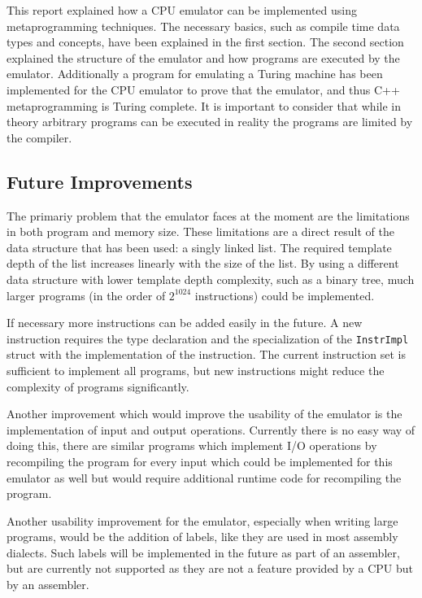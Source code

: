 
This report explained how a CPU emulator can be implemented using metaprogramming techniques.
The necessary basics, such as compile time data types and concepts, have been explained 
in the first section. The second section explained the structure of the emulator and how
programs are executed by the emulator. Additionally a program for emulating a Turing
machine has been implemented for the CPU emulator to prove that the emulator, and thus
C++ metaprogramming is Turing complete. It is important to consider that while in theory
arbitrary programs can be executed in reality the programs are limited by the compiler.

\subsection{Future Improvements}
The primariy problem that the emulator faces at the moment are the limitations in both program and memory size.
These limitations are a direct result of the data structure that has been used: a singly linked list. The required 
template depth of the list increases linearly with the size of the list. By using a different data structure with
lower template depth complexity, such as a binary tree, much larger programs (in the order of $2^{1024}$ instructions)
could be implemented.

If necessary more instructions can be added easily in the future. A new instruction
requires the type declaration and the specialization of the \lstinline{InstrImpl}
struct with the implementation of the instruction. The current instruction set
is sufficient to implement all programs, but new instructions might reduce the
complexity of programs significantly.

Another improvement which would improve the usability of the emulator is the implementation
of input and output operations. Currently there is no easy way of doing this, there are
similar programs which implement I/O operations by recompiling the program for
every input \cite{iohack1} \cite{iohack2} which could be implemented for this
emulator as well but would require additional runtime code for recompiling the program.

Another usability improvement for the emulator, especially when writing large programs,
would be the addition of labels, like they are used in most assembly dialects.
Such labels will be implemented in the future as part of an assembler, but are
currently not supported as they are not a feature provided by a CPU but by an assembler.
